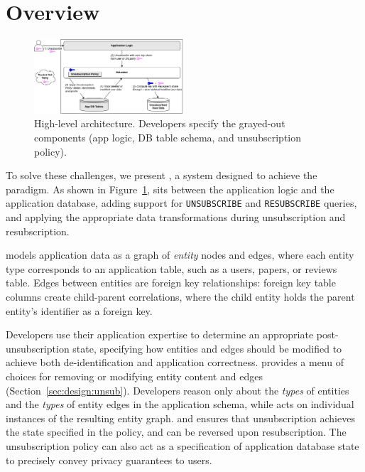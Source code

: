 \section{Overview}
\begin{figure}[t!]
    \centering
    \includegraphics[width=0.5\textwidth]{img/releaser_arch}

    \caption{High-level \sys architecture. Developers specify the grayed-out components (app logic, DB table schema, and
    unsubscription policy).}
    \label{fig:arch}
\end{figure}

To solve these challenges, we present \sys, a system designed to achieve the \name paradigm.
As shown in Figure~\ref{fig:arch}, \sys sits between the application logic and the application database, adding support for
\texttt{UNSUBSCRIBE} and \texttt{RESUBSCRIBE} queries, and applying the appropriate data transformations
during unsubscription and resubscription.

\sys models application data as a graph of \emph{entity} nodes and edges, where each entity type
corresponds to an application table, such as a users, papers, or reviews table. Edges between
entities are foreign key relationships: foreign key table columns 
create child-parent correlations, where the child entity holds the
parent entity's identifier as a foreign key. 

Developers use their application expertise to determine an appropriate post-unsubscription state,
specifying how entities and edges should be modified to achieve both de-identification and application correctness. 
\sys provides a menu of choices for removing or modifying entity content and edges (Section~\ref{sec:design:unsub}).
Developers reason only about the \emph{types} of entities and the \emph{types} of entity edges
in the application schema, while \sys acts on individual instances of the resulting entity graph. \sys and
ensures that unsubscription achieves the state specified in the policy, and can be reversed upon
resubscription. 
The unsubscription policy can also act as a specification of
application database state to precisely convey privacy guarantees to users.

